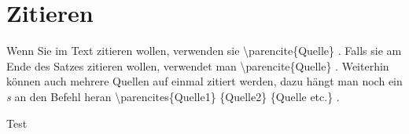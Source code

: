 \chapter{Zitieren}
Wenn Sie im Text zitieren wollen, verwenden sie \textbackslash parencite\{Quelle\} \textcite{Hu60}. Falls sie am Ende des Satzes zitieren wollen, verwendet man \textbackslash parencite\{Quelle\} \parencite[600]{OsRu94}. Weiterhin können auch mehrere Quellen auf einmal zitiert werden, dazu hängt man noch ein \emph{s} an den Befehl heran \textbackslash parencites\{Quelle1\} \{Quelle2\} \{Quelle etc.\} \parencites{NiRo00}{McMc87}{Pa01}.

Test \textcite{grasselli2020covid}